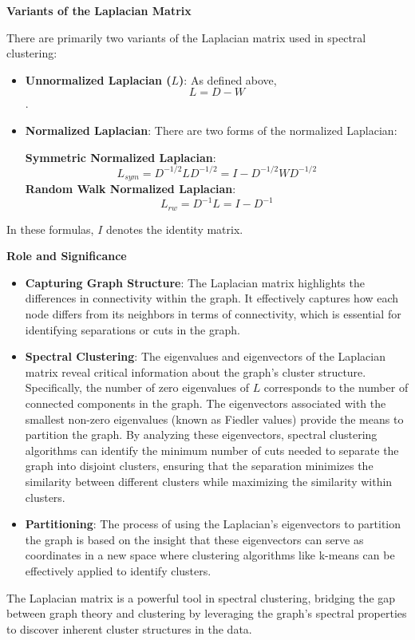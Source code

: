 \documentclass[11pt]{article}
\begin{document}
    \textbf{Variants of the Laplacian Matrix}

There are primarily two variants of the Laplacian matrix used in
spectral clustering:

\begin{itemize}
\item
  \textbf{Unnormalized Laplacian (\(L\))}: As defined above,
  \[L = D - W\].
\item
  \textbf{Normalized Laplacian}: There are two forms of the normalized
  Laplacian:

  \textbf{Symmetric Normalized Laplacian}:
  \[L_{sym} = D^{-1/2} L D^{-1/2} = I - D^{-1/2} W D^{-1/2}\]
  \textbf{Random Walk Normalized Laplacian}:
  \[L_{rw} = D^{-1} L = I - D^{-1} \]
\end{itemize}

In these formulas, \(I\) denotes the identity matrix.

    \textbf{Role and Significance}

\begin{itemize}
\item
  \textbf{Capturing Graph Structure}: The Laplacian matrix highlights
  the differences in connectivity within the graph. It effectively
  captures how each node differs from its neighbors in terms of
  connectivity, which is essential for identifying separations or cuts
  in the graph.
\item
  \textbf{Spectral Clustering}: The eigenvalues and eigenvectors of the
  Laplacian matrix reveal critical information about the graph's cluster
  structure. Specifically, the number of zero eigenvalues of \(L\)
  corresponds to the number of connected components in the graph. The
  eigenvectors associated with the smallest non-zero eigenvalues (known
  as Fiedler values) provide the means to partition the graph. By
  analyzing these eigenvectors, spectral clustering algorithms can
  identify the minimum number of cuts needed to separate the graph into
  disjoint clusters, ensuring that the separation minimizes the
  similarity between different clusters while maximizing the similarity
  within clusters.
\item
  \textbf{Partitioning}: The process of using the Laplacian's
  eigenvectors to partition the graph is based on the insight that these
  eigenvectors can serve as coordinates in a new space where clustering
  algorithms like k-means can be effectively applied to identify
  clusters.
\end{itemize}

    The Laplacian matrix is a powerful tool in spectral clustering, bridging
the gap between graph theory and clustering by leveraging the graph's
spectral properties to discover inherent cluster structures in the data.
\end{document}
